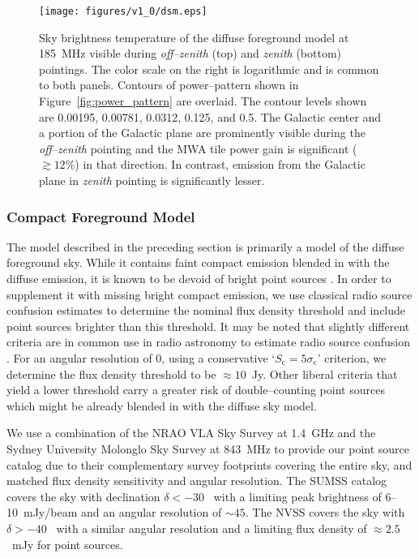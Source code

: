\documentclass[preprint2,iop,numberedappendix]{emulateapj}
\begin{document}
\begin{figure}[htb]
\centering
\texttt{[image: figures/v1\_0/dsm.eps]}
\caption{Sky brightness temperature of the diffuse foreground model at 185~MHz visible during {\it off--zenith} (top) and {\it zenith} (bottom) pointings. The color scale on the right is logarithmic and is common to both panels. Contours of power--pattern shown in Figure~\ref{fig:power_pattern} are overlaid. The contour levels shown are 0.00195, 0.00781, 0.0312, 0.125, and 0.5. The Galactic center and a portion of the Galactic plane are prominently visible during the {\it off--zenith} pointing and the MWA tile power gain is significant ($\gtrsim 12$\%) in that direction. In contrast, emission from the Galactic plane in {\it zenith} pointing is significantly lesser. \label{fig:DSM}}
\end{figure}

\subsubsection{Compact Foreground Model}\label{sec:CSM}

The model described in the preceding section is primarily a model of the diffuse foreground sky. While it contains faint compact emission blended in with the diffuse emission, it is known to be devoid of bright point sources \citep{deo08}. In order to supplement it with missing bright compact emission, we use classical radio source confusion estimates to determine the nominal flux density threshold and include point sources brighter than this threshold. It may be noted that slightly different criteria are in common use in radio astronomy to estimate radio source confusion \citep[see Appendix of][and references therein]{thy13}. For an angular resolution of 0, using a conservative `$S_\textrm{c}=5\sigma_\textrm{c}$' criterion, we determine the flux density threshold to be $\approx 10$~Jy. Other liberal criteria that yield a lower threshold carry a greater risk of double--counting point sources which might be already blended in with the diffuse sky model. 

We use a combination of the NRAO VLA Sky Survey \citep[NVSS;][]{con98} at 1.4~GHz and the Sydney University Molonglo Sky Survey \citep[SUMSS;][]{boc99,mau03} at 843~MHz to provide our point source catalog due to their complementary survey footprints covering the entire sky, and matched flux density sensitivity and angular resolution. The SUMSS catalog covers the sky with declination $\delta < -30$\arcdeg~ with a limiting peak brightness of 6--10~mJy/beam and an angular resolution of $\sim 45$\arcsec. The NVSS covers the sky with $\delta > -40$\arcdeg~ with a similar angular resolution and a limiting flux density of $\approx 2.5$~mJy for point sources. 
\end{document}
